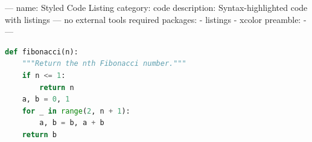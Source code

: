 ---
name: Styled Code Listing
category: code
description: Syntax-highlighted code with listings — no external tools required
packages:
  - listings
  - xcolor
preamble:
  - 
---
\begin{lstlisting}[style=texflow, language=Python, caption={Example Code}]
def fibonacci(n):
    """Return the nth Fibonacci number."""
    if n <= 1:
        return n
    a, b = 0, 1
    for _ in range(2, n + 1):
        a, b = b, a + b
    return b
\end{lstlisting}
